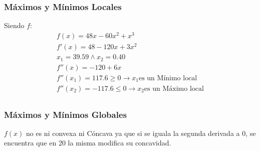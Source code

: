 \begin{homeworkProblem}
\subsubsection{Máximos y Mínimos Locales}
Siendo $f$:
\begin{align*}
    f(x) = 48x - 60x^2 + x^3 \\
    f'(x) = 48 - 120x + 3x^2 \\
    x_1 = 39.59 \wedge x_2 = 0.40 \\
    f''(x) = -120 + 6x \\
    f''(x_1) = 117.6 \geq 0 \rightarrow x_1 \text{es un Mínimo local}\\
    f''(x_2) = -117.6 \leq 0 \rightarrow x_2 \text{es un Máximo local}\\
\end{align*}

\subsubsection{Máximos y Mínimos Globales}
$f(x)$ no es ni convexa ni Cóncava ya que si se iguala la segunda derivada a 0, se encuentra que en 20 la misma modifica su concavidad.
\end{homeworkProblem}